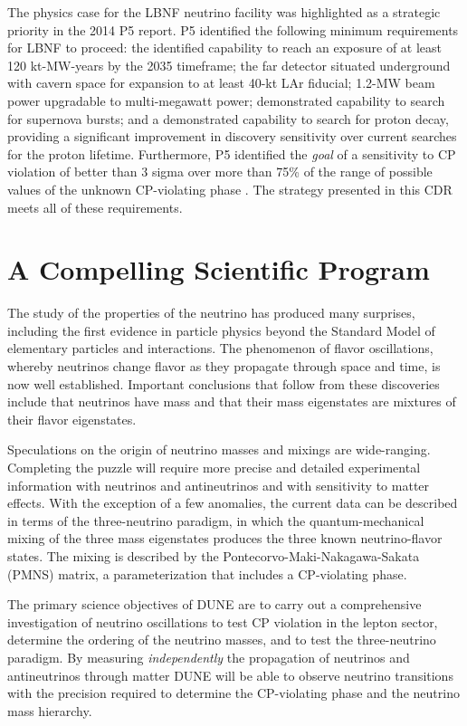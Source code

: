 The physics case for the LBNF neutrino facility was highlighted as a strategic priority in the 2014 P5 report.
P5 identified the following minimum requirements for LBNF to proceed: 
the identified capability to reach an exposure of at least 120 kt-MW-years by the 2035 timeframe;
the far detector situated underground with cavern space for expansion to at least 40-kt LAr fiducial;
1.2-MW beam power upgradable to multi-megawatt power;
demonstrated capability to search for supernova bursts; and
a demonstrated capability to search for proton decay, 
providing a significant improvement in discovery sensitivity over current searches for the proton lifetime.
Furthermore, P5 identified  the {\it goal} of a sensitivity to CP violation of better than 3 sigma over more than 75\% 
of the range of possible values of the unknown CP-violating phase \deltacp.
The strategy presented in this CDR meets all of these requirements.



\section{A Compelling Scientific Program}

The study of the properties of the neutrino has produced %
many surprises, including the first evidence in particle physics beyond the Standard Model of elementary particles and interactions.   The phenomenon of flavor oscillations, whereby neutrinos change flavor as they propagate through space and time, is now well established. Important conclusions that follow from these discoveries include that neutrinos have mass and that their %
mass eigenstates are mixtures of their %
flavor eigenstates.

Speculations on the origin of neutrino masses and mixings are wide-ranging. 
Completing the puzzle will require more precise and detailed experimental information with neutrinos and antineutrinos and with sensitivity to matter effects. With the exception of a few anomalies, the current data can be described in terms of the three-neutrino paradigm, in which the 
quantum-mechanical mixing of the three mass eigenstates produces the three known neutrino-flavor states.  The mixing is described by the Pontecorvo-Maki-Nakagawa-Sakata (PMNS) matrix, a parameterization that includes a CP-violating phase. 

The primary science objectives %
of DUNE are to carry out a comprehensive investigation of neutrino oscillations to test CP violation in the lepton sector, determine the ordering of the neutrino masses, and to test the three-neutrino paradigm.
By measuring \textit{independently} the  propagation of neutrinos and antineutrinos through matter DUNE will be able to observe %
neutrino transitions with the precision required to determine the 
CP-violating phase and %
the neutrino mass hierarchy.

